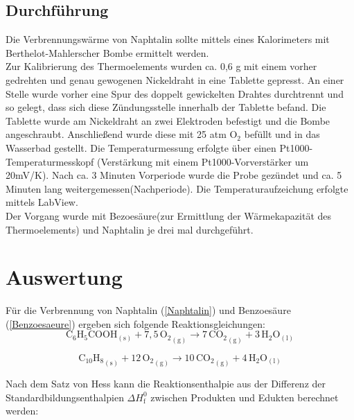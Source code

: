 \documentclass[12pt,a4paper,titlepage,headinclude,bibtotoc]{scrartcl}
\begin{document}
\subsection{Durchführung}
Die Verbrennungswärme von Naphtalin sollte mittels eines Kalorimeters mit Berthelot-Mahlerscher Bombe ermittelt werden.\\
Zur Kalibrierung des Thermoelements wurden ca. 0,6 g mit einem vorher gedrehten und genau gewogenen Nickeldraht in eine Tablette gepresst. An einer Stelle wurde vorher eine Spur des doppelt gewickelten Drahtes durchtrennt und so gelegt, dass sich diese Zündungsstelle innerhalb der Tablette befand. Die Tablette wurde am Nickeldraht an zwei Elektroden befestigt und die Bombe angeschraubt. Anschließend wurde diese mit 25 atm O$_2$ befüllt und in das Wasserbad gestellt.  Die Temperaturmessung erfolgte über einen Pt1000-\,Temperaturmesskopf (Verstärkung mit einem Pt1000-Vorverstärker um 20mV/K). Nach ca. 3 Minuten Vorperiode wurde die Probe gezündet und ca. 5 Minuten lang weitergemessen(Nachperiode).
Die Temperaturaufzeichung erfolgte mittels LabView.\\
Der Vorgang wurde mit Bezoesäure(zur Ermittlung der Wärmekapazität des Thermoelements) und Naphtalin je drei mal durchgeführt.\\ 

\section{Auswertung}

Für die Verbrennung von Naphtalin (\ref{Naphtalin}) und Benzoesäure (\ref{Benzoesaeure}) ergeben sich folgende Reaktionsgleichungen:\\

\begin{equation}\label{Benzoesaeure}
\mathrm{C_6}\mathrm{H}_5\mathrm{COOH}_\mathrm{(s)} + 7,5\,{\mathrm{O}_2}_\mathrm{(g)} \rightarrow 7\,{\mathrm{CO}_2}_\mathrm{(g)} +3\,\mathrm{H}_2\mathrm{O}_\mathrm{(l)}
\end{equation}

\begin{equation}\label{Naphtalin}
{\mathrm{C}_{10}\mathrm{H}_8}_\mathrm{(s)} + 12\,{\mathrm{O}_2}_\mathrm{(g)} \rightarrow 10\,{\mathrm{CO}_2}_\mathrm{(g)} + 4\,\mathrm{H}_2\mathrm{O}_\mathrm{(l)}
\end{equation}

Nach dem Satz von Hess kann die Reaktionsenthalpie aus der Differenz der Standardbildungsenthalpien $\Delta H_\mathrm{f}^0$ zwischen Produkten und Edukten berechnet werden:\\
\end{document}
